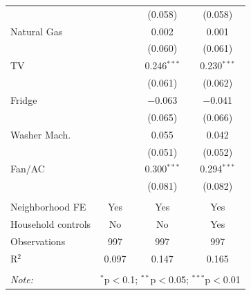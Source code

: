 \begin{table}[H]
\begin{tabular}{@{\extracolsep{-7pt}}lccc}
  &  & (0.058) & (0.058) \\ 
  Natural Gas &  & 0.002 & 0.001 \\ 
  &  & (0.060) & (0.061) \\ 
  TV &  & 0.246$^{***}$ & 0.230$^{***}$ \\ 
  &  & (0.061) & (0.062) \\ 
  Fridge &  & $-$0.063 & $-$0.041 \\ 
  &  & (0.065) & (0.066) \\ 
  Washer Mach. &  & 0.055 & 0.042 \\ 
  &  & (0.051) & (0.052) \\ 
  Fan/AC &  & 0.300$^{***}$ & 0.294$^{***}$ \\ 
  &  & (0.081) & (0.082) \\ 
 \hline \\[-1.8ex] 
Neighborhood FE & Yes & Yes & Yes \\ 
Household controls & No & No & Yes \\ 
Observations & 997 & 997 & 997 \\ 
R$^{2}$ & 0.097 & 0.147 & 0.165 \\ 
\hline 
\hline \\[-1.8ex] 
\textit{Note:}  & \multicolumn{3}{r}{$^{*}$p$<$0.1; $^{**}$p$<$0.05; $^{***}$p$<$0.01} \\ 
\end{tabular} 
\end{table} 
